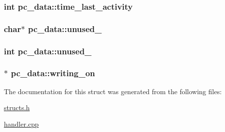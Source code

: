\hypertarget{structpc__data_a1eb8fa8d7bf5c64bf384af8de0757f69}{
\subsubsection[{time\-\_\-last\-\_\-activity}]{\setlength{\rightskip}{0pt plus 5cm}int pc\-\_\-data\-::time\-\_\-last\-\_\-activity}}\label{structpc__data_a1eb8fa8d7bf5c64bf384af8de0757f69}
\hypertarget{structpc__data_a4e5011cbaec85ae1765ec77d28f3f6a5}{
\subsubsection[{unused\-\_\-01}]{\setlength{\rightskip}{0pt plus 5cm}char$\ast$ pc\-\_\-data\-::unused\-\_}}\label{structpc__data_a4e5011cbaec85ae1765ec77d28f3f6a5}
\hypertarget{structpc__data_ab92382e032c54cdd911dc1c62925ca88}{
\subsubsection[{unused\-\_\-02}]{\setlength{\rightskip}{0pt plus 5cm}int pc\-\_\-data\-::unused\-\_}}\label{structpc__data_ab92382e032c54cdd911dc1c62925ca88}
\hypertarget{structpc__data_af52a407aac34be84c0b0bea0960360a0}{
\subsubsection[{writing\-\_\-on}]{$\ast$ pc\-\_\-data\-::writing\-\_\-on}}\label{structpc__data_af52a407aac34be84c0b0bea0960360a0}


The documentation for this struct was generated from the following files\-:\begin{DoxyCompactItemize}
\item 
\hyperlink{structs_8h}{structs.\-h}\item 
\hyperlink{handler_8cpp}{handler.\-cpp}\end{DoxyCompactItemize}
